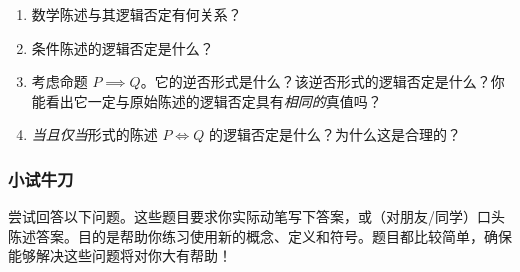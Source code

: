 \begin{enumerate}[label=(\arabic*)]
    \item 数学陈述与其逻辑否定有何关系？
    \item 条件陈述的逻辑否定是什么？
    \item 考虑命题 $P \implies Q$。它的逆否形式是什么？该逆否形式的逻辑否定是什么？你能看出它一定与原始陈述的逻辑否定具有\emph{相同的}真值吗？
    \item \emph{当且仅当}形式的陈述 $P \iff Q$ 的逻辑否定是什么？为什么这是合理的？
\end{enumerate}

\subsubsection*{小试牛刀}

尝试回答以下问题。这些题目要求你实际动笔写下答案，或（对朋友/同学）口头陈述答案。目的是帮助你练习使用新的概念、定义和符号。题目都比较简单，确保能够解决这些问题将对你大有帮助！

